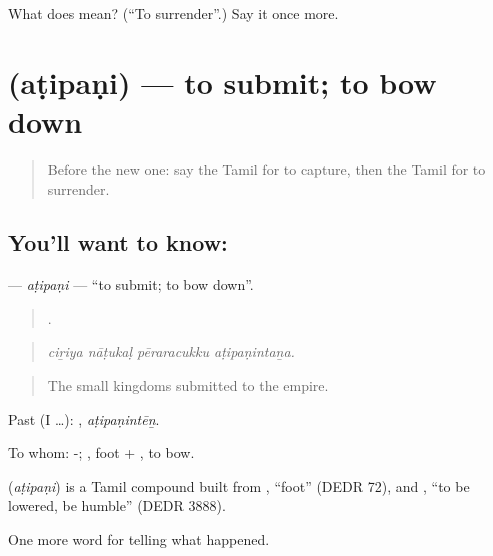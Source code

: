 \begin{tcolorbox}[breakable,colback=teal!4,colframe=teal!35!black,title={Before you move on}]
What does  mean? (\textquotedblleft{}To surrender\textquotedblright{}.) Say it once more.
\end{tcolorbox}
\section[\texorpdfstring{\ta{அடிபணி} (aṭipaṇi)}{அடிபணி (aṭipaṇi)}]{ (aṭipaṇi) — to submit; to bow down}

\label{lesson:TA-C336-atipani}



\begin{quote}
Before the new one: say the Tamil for to capture, then the Tamil for to surrender.
\end{quote}

\subsection*{You'll want to know: }
\textbf{} — \emph{aṭipaṇi} — \textquotedblleft{}to submit; to bow down\textquotedblright{}.

\begin{quote}
   .
\end{quote}

\begin{quote}
\emph{ciṟiya nāṭukaḷ pēraracukku aṭipaṇintaṉa.}
\end{quote}

\begin{quote}
The small kingdoms submitted to the empire.
\end{quote}

Past (I …): , \emph{aṭipaṇintēṉ}.

To whom: -; , foot + , to bow.

\begin{cousinweb}
\textbf{} (\emph{aṭipaṇi}) is a Tamil compound built from , \textquotedblleft{}foot\textquotedblright{} (DEDR 72), and , \textquotedblleft{}to be lowered, be humble\textquotedblright{} (DEDR 3888).
\end{cousinweb}

\begin{grammarlens}[title={What you've built}]
One more word for telling what happened.
\end{grammarlens}

